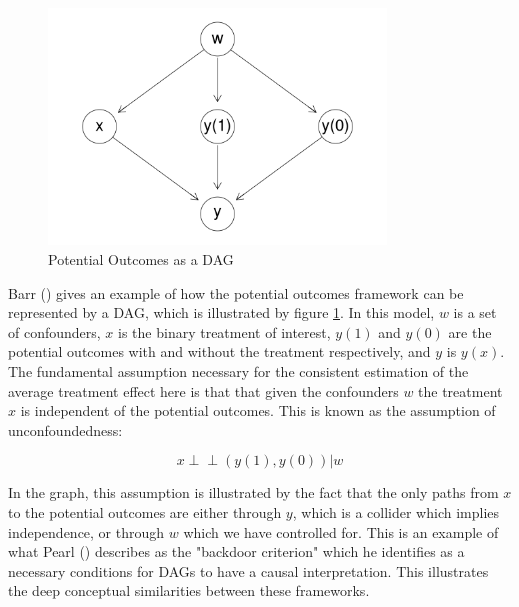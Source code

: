 \documentclass{article}
\begin{document}
\begin{figure}
  \centering
  \includegraphics[width=0.8\textwidth]{images/potential_outcomes_dag.png}
  \caption{Potential Outcomes as a DAG}
  \label{dag6}
\end{figure}

Barr (\citeyear{barr2018causal}) gives an example of how the potential outcomes framework can be represented by a DAG, which is illustrated by figure \ref{dag6}. In this model, $w$ is a set of confounders, $x$ is the binary treatment of interest, $y(1)$ and $y(0)$ are the potential outcomes with and without the treatment respectively, and $y$ is $y(x)$. The fundamental assumption necessary for the consistent estimation of the average treatment effect here is that that given the confounders $w$ the treatment $x$ is independent of the potential outcomes. This is known as the assumption of unconfoundedness:
 
\begin{equation}
  x \perp \!\!\! \perp  (y(1), y(0)) | w
\end{equation}

In the graph, this assumption is illustrated by the fact that the only paths from $x$ to the potential outcomes are either through $y$, which is a collider which implies independence, or through $w$ which we have controlled for. This is an example of what Pearl (\citeyear{pearl2018book}) describes as the "backdoor criterion" which he identifies as a necessary conditions for DAGs to have a causal interpretation. This illustrates the deep conceptual similarities between these frameworks.
\end{document}
